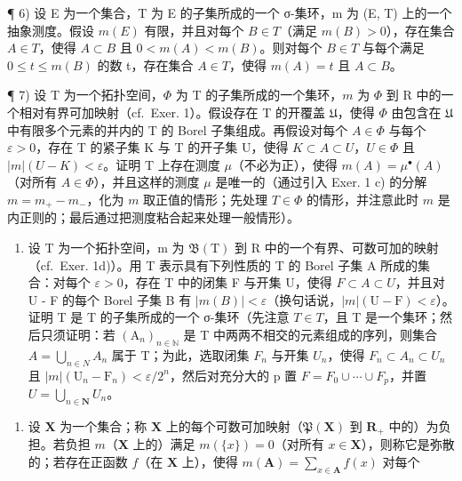 ¶ 6) 设 E 为一个集合，T 为 E 的子集所成的一个 σ-集环，m 为 (E, T) 上的一个抽象测度。假设 \(m(E)\) 有限，并且对每个 \(B \in T\)（满足 \(m(B) > 0\)），存在集合 \(A \in T\)，使得 \(A \subset B\) 且 \(0 < m(A) < m(B)\)。则对每个 \(B \in T\) 与每个满足 \(0 \leqslant t \leqslant m(B)\) 的数 t，存在集合 \(A \in T\)，使得 \(m(A) = t\) 且 \(A \subset B\)。

¶ 7) 设 T 为一个拓扑空间，\(\Phi\) 为 T 的子集所成的一个集环，\(m\) 为 \(\Phi\) 到 R 中的一个相对有界可加映射（cf.~Exer. 1）。假设存在 T 的开覆盖 \(\mathfrak{U}\)，使得 \(\Phi\) 由包含在 \(\mathfrak{U}\) 中有限多个元素的并内的 T 的 Borel 子集组成。再假设对每个 \(A \in \Phi\) 与每个 \(\varepsilon > 0\)，存在 T 的紧子集 K 与 T 的开子集 U，使得 \(K \subset A \subset U\)，\(U \in \Phi\) 且 \(|m|(U - K) < \varepsilon\)。证明 T 上存在测度 \(\mu\)（不必为正），使得 \(m(A) = \mu^{\bullet}(A)\)（对所有 \(A \in \Phi\)），并且这样的测度 \(\mu\) 是唯一的（通过引入 Exer. 1 c) 的分解 \(m = m_{+} - m_{-}\)，化为 \(m\) 取正值的情形；先处理 \(T \in \Phi\) 的情形，并注意此时 \(m\) 是内正则的；最后通过把测度粘合起来处理一般情形）。

\begin{enumerate}
\def\labelenumi{\arabic{enumi})}
\setcounter{enumi}{7}
\tightlist
\item
  设 T 为一个拓扑空间，m 为 \(\mathfrak{B}(\mathrm{T})\) 到 R 中的一个有界、可数可加的映射（cf.~Exer. 1d)）。用 T 表示具有下列性质的 T 的 Borel 子集 A 所成的集合：对每个 \(\varepsilon > 0\)，存在 T 中的闭集 F 与开集 U，使得 \(F \subset A \subset U\)，并且对 U - F 的每个 Borel 子集 B 有 \(|m(B)| < \varepsilon\)（换句话说，\(|m|(\mathrm{U} - \mathrm{F}) < \varepsilon\)）。证明 T 是 T 的子集所成的一个 σ-集环（先注意 \(T \in T\)，且 T 是一个集环；然后只须证明：若 \((\mathrm{A}_{n})_{n \in \mathbb{N}}\) 是 T 中两两不相交的元素组成的序列，则集合 \(A = \bigcup_{n \in N} A_{n}\) 属于 T；为此，选取闭集 \(F_{n}\) 与开集 \(U_{n}\)，使得 \(F_{n} \subset A_{n} \subset U_{n}\) 且 \(|m|(\mathrm{U}_{n} - \mathrm{F}_{n}) < \varepsilon / 2^{n}\)，然后对充分大的 p 置 \(F = F_{0} \cup \cdots \cup F_{p}\)，并置 \(U = \bigcup_{n \in \mathbf{N}} U_{n}\)。
\end{enumerate}


\begin{enumerate}
\def\labelenumi{\arabic{enumi})}
\setcounter{enumi}{8}
\tightlist
\item
  设 \(\mathbf{X}\) 为一个集合；称 \(\mathbf{X}\) 上的每个可数可加映射（\(\mathfrak{P}(\mathbf{X})\) 到 \(\mathbf{R}_+\) 中的）为负担。若负担 \(m\)（\(\mathbf{X}\) 上的）满足 \(m(\{x\}) = 0\)（对所有 \(x \in \mathbf{X}\)），则称它是弥散的；若存在正函数 \(f\)（在 \(\mathbf{X}\) 上），使得 \(m(\mathbf{A}) = \sum_{x \in \mathbf{A}} f(x)\) 对每个
\end{enumerate}

